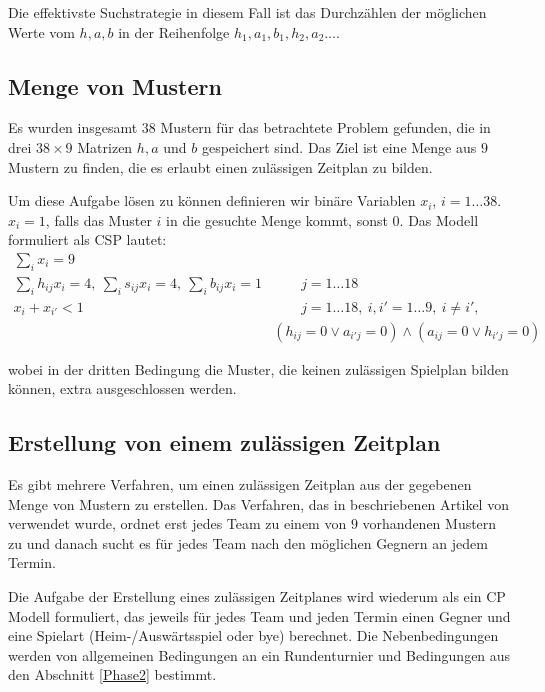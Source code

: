 Die effektivste Suchstrategie in diesem Fall ist das Durchzählen der möglichen Werte vom $h,a,b$ in der Reihenfolge $h_1,a_1,b_1,h_2,a_2\dots$.

\subsection{Menge von Mustern}

Es wurden insgesamt $38$ Mustern für das betrachtete Problem gefunden, die in drei $38\times 9$ Matrizen $h,a$ und $b$ gespeichert sind. Das Ziel ist eine Menge aus $9$ Mustern zu finden, die es erlaubt einen zulässigen Zeitplan zu bilden.

Um diese Aufgabe lösen zu können definieren wir binäre Variablen $x_i$, $i=1\dots 38$. $x_i=1$, falls das Muster $i$ in die gesuchte Menge kommt, sonst $0$.
Das Modell formuliert als CSP lautet:
\begin{align}
  \sum_{i}x_i=9 &  \nonumber \\
  \sum_{i}h_{ij}x_i = 4,\ \sum_{i}s_{ij}x_i = 4,\ \sum_{i}b_{ij}x_i = 1 &\qquad  j=1\dots 18 \nonumber \\
  x_i+x_{i'} <1  &\qquad  j=1\dots 18,\ i,i'=1\dots 9,\ i\not=i', \nonumber\\
  & (h_{ij}=0 \vee a_{i'j}=0)\wedge(a_{ij}=0 \vee h_{i'j}=0) \nonumber  
\end{align}

wobei in der dritten Bedingung die Muster, die keinen zulässigen Spielplan bilden können, extra ausgeschlossen werden.

\subsection{Erstellung von einem zulässigen Zeitplan}
Es gibt mehrere Verfahren, um einen zulässigen Zeitplan aus der gegebenen Menge von Mustern zu erstellen. Das Verfahren, das in beschriebenen Artikel von \cite{Timetabling} verwendet wurde, ordnet erst jedes Team zu einem von $9$ vorhandenen Mustern zu und danach sucht es für jedes Team nach den möglichen Gegnern an jedem Termin.

Die Aufgabe der Erstellung eines zulässigen Zeitplanes wird wiederum als ein CP Modell formuliert, das jeweils für jedes Team und jeden Termin einen Gegner und eine Spielart (Heim-/Auswärtsspiel oder bye) berechnet. Die Nebenbedingungen werden von allgemeinen Bedingungen an ein Rundenturnier und Bedingungen aus den Abschnitt \ref{Phase2} bestimmt.